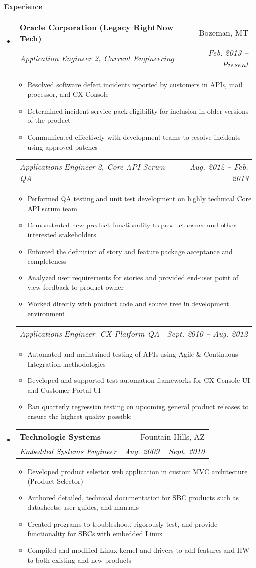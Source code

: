 \documentclass[letterpaper,11pt]{article}
\makeatletter
\newcommand{\resitem}[1]{\item #1 \vspace{-2pt}}
\newcommand{\resheading}[1]{{\large \colorbox{mygrey}{\begin{minipage}{\textwidth}{\textbf{#1 \vphantom{p\^{E}}}}\end{minipage}}}}
\newcommand{\ressubheading}[4]{
    \begin{tabular*}{6.5in}{l@{\extracolsep{\fill}}r}
      \textbf{#1} & #2 \\
      \textit{#3} & \textit{#4} \\
  \end{tabular*}\vspace{-6pt}}
\newcommand{\ressubsubheading}[2]{
    \begin{tabular*}{6.5in}{l@{\extracolsep{\fill}}r}
      \textit{#1} & \textit{#2} \\
  \end{tabular*}\vspace{-6pt}}
\makeatother
\begin{document}
  \resheading{Experience}
  \begin{itemize}
    \item %
      \ressubheading{Oracle Corporation (Legacy RightNow Tech)}{Bozeman, MT}
      {Application Engineer 2, Current Engineering}{Feb. 2013 -- Present}
      { \footnotesize
	\begin{itemize}
	    \resitem{Resolved software defect incidents reported by customers in APIs, mail processor, and CX Console}
	    \resitem{Determined incident service pack eligibility for inclusion in older versions of the product}
	    \resitem{Communicated effectively with development teams to resolve incidents using approved patches}
	\end{itemize}
      }

      \ressubsubheading{Applications Engineer 2, Core API Scrum QA}{Aug. 2012 -- Feb. 2013}
      { \footnotesize
	\begin{itemize}
	    \resitem{Performed QA testing and unit test development on highly technical Core API scrum team}
	    \resitem{Demonstrated new product functionality to product owner and other interested stakeholders}
	    \resitem{Enforced the definition of story and feature package acceptance and completeness}
	    \resitem{Analyzed user requirements for stories and provided end-user point of view feedback to product owner}
	    \resitem{Worked directly with product code and source tree in development environment}
	\end{itemize}
      }

      \ressubsubheading{Applications Engineer, CX Platform QA}{Sept. 2010 -- Aug. 2012}
      { \footnotesize
	\begin{itemize}
	    \resitem{Automated and maintained testing of APIs using Agile \& Continuous Integration methodologies}
	    \resitem{Developed and supported test automation frameworks for CX Console UI and Customer Portal UI}
	    \resitem{Ran quarterly regression testing on upcoming general product releases to ensure the highest quality possible}
	\end{itemize}
      }

    \item 
      \ressubheading{Technologic Systems}{Fountain Hills, AZ}{Embedded Systems Engineer}{Aug. 2009 -- Sept. 2010}
      { \footnotesize
	\begin{itemize}
	    \resitem{Developed product selector web application in custom MVC architecture (Product Selector)}
	    \resitem{Authored detailed, technical documentation for SBC products such as datasheets,  user guides, and manuals}
	    \resitem{Created programs to troubleshoot, rigorously test, and provide functionality for SBCs with embedded Linux}
	    \resitem{Compiled and modified Linux kernel and drivers to add features and HW to both existing and new products}
	\end{itemize}
      }

  \end{itemize}  %
\end{document}
